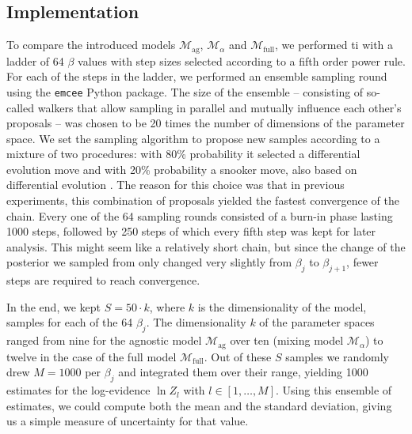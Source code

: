\documentclass[\relativeRoot/main.tex]{subfiles}
\begin{document}
\subsection*{Implementation}
\label{subsec:bilateral:model_comp:implementation}

To compare the introduced models $\mathcal{M}_\text{ag}$, $\mathcal{M}_\alpha$ and $\mathcal{M}_\text{full}$, we performed \gls{ti} with a ladder of 64 $\beta$ values with step sizes selected according to a fifth order power rule. For each of the steps in the ladder, we performed an ensemble sampling round using the \texttt{emcee} \cite{foreman-mackey_emcee_2013} Python package. The size of the ensemble -- consisting of so-called walkers that allow sampling in parallel and mutually influence each other's proposals -- was chosen to be 20 times the number of dimensions of the parameter space. We set the sampling algorithm to propose new samples according to a mixture of two procedures: with 80\% probability it selected a differential evolution move \cite{nelson_run_2013} and with 20\% probability a snooker move, also based on differential evolution \cite{ter_braak_differential_2008}. The reason for this choice was that in previous experiments, this combination of proposals yielded the fastest convergence of the chain. Every one of the 64 sampling rounds consisted of a burn-in phase lasting 1000 steps, followed by 250 steps of which every fifth step was kept for later analysis. This might seem like a relatively short chain, but since the change of the posterior we sampled from only changed very slightly from $\beta_j$ to $\beta_{j+1}$, fewer steps are required to reach convergence.

In the end, we kept $S = 50 \cdot k$, where $k$ is the dimensionality of the model, samples for each of the 64 $\beta_j$. The dimensionality $k$ of the parameter spaces ranged from nine for the agnostic model $\mathcal{M}_\text{ag}$ over ten (mixing model $\mathcal{M}_\alpha$) to twelve in the case of the full model $\mathcal{M}_\text{full}$. Out of these $S$ samples we randomly drew $M = 1000$ per $\beta_j$ and integrated them over their range, yielding 1000 estimates for the log-evidence $\ln{Z}_l$ with $l \in [1, \ldots, M]$. Using this ensemble of estimates, we could compute both the mean and the standard deviation, giving us a simple measure of uncertainty for that value.
\end{document}
